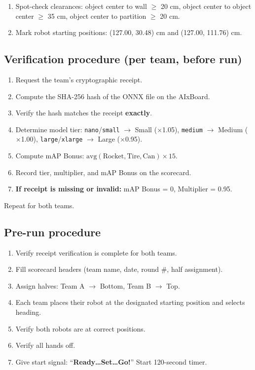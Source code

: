 \documentclass[a4]{article}
\begin{document}
\begin{enumerate}[resume]
    \item Spot-check clearances: object center to wall $\geq$ 20 cm, object center to object center $\geq$ 35 cm, object center to partition $\geq$ 20 cm.
    \item Mark robot starting positions: (127.00, 30.48) cm and (127.00, 111.76) cm.
\end{enumerate}

\subsection*{Verification procedure (per team, before run)}

\begin{enumerate}
    \item Request the team's cryptographic receipt.
    \item Compute the SHA-256 hash of the ONNX file on the AIxBoard.
    \item Verify the hash matches the receipt \textbf{exactly}.
    \item Determine model tier: \texttt{nano}/\texttt{small} $\rightarrow$ Small ($\times$1.05), \texttt{medium} $\rightarrow$ Medium ($\times$1.00), \texttt{large}/\texttt{xlarge} $\rightarrow$ Large ($\times$0.95).
    \item Compute mAP Bonus: $\text{avg}(\text{Rocket}, \text{Tire}, \text{Can}) \times 15$.
    \item Record tier, multiplier, and mAP Bonus on the scorecard.
    \item \textbf{If receipt is missing or invalid:} mAP Bonus = 0, Multiplier = 0.95.
\end{enumerate}

Repeat for both teams.

\subsection*{Pre-run procedure}

\begin{enumerate}
    \item Verify receipt verification is complete for both teams.
    \item Fill scorecard headers (team name, date, round \#, half assignment).
    \item Assign halves: Team A $\rightarrow$ Bottom, Team B $\rightarrow$ Top.
    \item Each team places their robot at the designated starting position and selects heading.
    \item Verify both robots are at correct positions.
    \item Verify all hands off.
    \item Give start signal: ``\textbf{Ready\ldots Set\ldots Go!}'' Start 120-second timer.
\end{enumerate}
\end{document}
